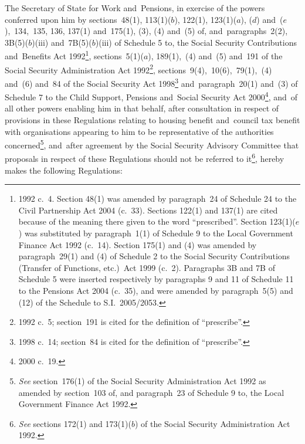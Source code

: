 \documentclass[12pt,a4paper]{article}
\title{\regstitle}
\author{S.I.\ 2005 No.\ 2878}
\date{Made
13th October 2005\\
Laid before Parliament
20th October 2005\\
Coming into~force
5th December 2005
}
\begin{document}
\maketitle

\begin{sloppypar}
\noindent
The Secretary of State for Work and~Pensions, in exercise of the powers conferred upon him by sections~48(1), 113(1)($b$), 122(1), 123(1)($a$), ($d$)  and~($e$),~134,~135, 136, 137(1) and~175(1), (3), (4) and~(5) of, and~paragraphs~2(2), 3B(5)($b$)(iii) and~7B(5)($b$)(iii) of Schedule 5 to, the Social Security Contributions and~Benefits Act 1992\footnote{1992 c.~4. Section 48(1) was amended by paragraph~24 of Schedule 24 to the Civil Partnership Act 2004 (c.~33). Sections 122(1) and 137(1) are cited because of the meaning there given to the word “prescribed”. Section 123(1)($e$) was substituted by paragraph~1(1) of Schedule 9 to the Local Government Finance Act 1992 (c.~14). Section 175(1) and (4) was amended by paragraph~29(1) and (4) of Schedule 2 to the Social Security Contributions (Transfer of Functions, etc.)\ Act 1999 (c.~2). Paragraphs 3B and 7B of Schedule 5 were inserted respectively by paragraphs 9 and 11 of Schedule 11 to the Pensions Act 2004 (c.~35), and were amended by paragraph~5(5) and (12) of the Schedule to S.I.~2005/2053.}, sections~5(1)($a$), 189(1),~(4) and~(5) and~191 of the Social Security Administration Act 1992\footnote{1992 c.~5; section~191 is cited for the definition of “prescribe”.}, sections~9(4),~10(6),~79(1),~(4) and~(6) and~84 of the Social Security Act 1998\footnote{1998 c.~14; section~84 is cited for the definition of “prescribe”.} and~paragraph~20(1) and~(3) of Schedule 7 to the Child Support, Pensions and~Social Security Act 2000\footnote{2000 c.~19.}, and~of all other powers enabling him in that behalf, after consultation in respect of provisions in these Regulations relating to housing benefit and~council tax benefit with organisations appearing to him to be representative of the authorities concerned\footnote{\emph{See} section~176(1) of the Social Security Administration Act 1992 as amended by section~103 of, and paragraph~23 of Schedule 9 to, the Local Government Finance Act 1992.}, and~after agreement by the Social Security Advisory Committee that proposals in respect of these Regulations should not be referred to it\footnote{\emph{See} sections 172(1) and 173(1)($b$) of the Social Security Administration Act 1992.}, hereby makes the following Regulations: 
\end{sloppypar}
\end{document}
